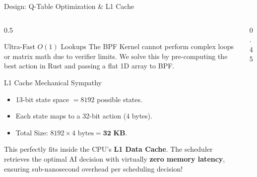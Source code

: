 \documentclass[aspectratio=169]{beamer}
\begin{document}
\begin{frame}{Design: Q-Table Optimization \& L1 Cache}
    
        \vspace{-0.5cm}

\begin{columns}[T]
        \begin{column}{0.5\textwidth}
            \begin{exampleblock}{Ultra-Fast $O(1)$ Lookups}
                \small
                The BPF Kernel cannot perform complex loops or matrix math due to verifier limits. We solve this by pre-computing the best action in Rust and passing a flat 1D array to BPF.
            \end{exampleblock}
            \vspace{-0.5cm}
            \begin{alertblock}{L1 Cache Mechanical Sympathy}
                \small
                \begin{itemize}
                    \item 13-bit state space $= 8192$ possible states.
                    \item Each state maps to a 32-bit action ($4$ bytes).
                    \item Total Size: $8192 \times 4 \text{ bytes} = \mathbf{32 \text{ KB}}$.
                \end{itemize}
                This perfectly fits inside the CPU's \textbf{L1 Data Cache}. The scheduler retrieves the optimal AI decision with virtually \textbf{zero memory latency}, ensuring sub-nanosecond overhead per scheduling decision!
            \end{alertblock}
        \end{column}

        \begin{column}{0.45\textwidth}
            \centering
            \vspace{0.5cm}
\end{column}
\end{columns}
\end{frame}
\end{document}
